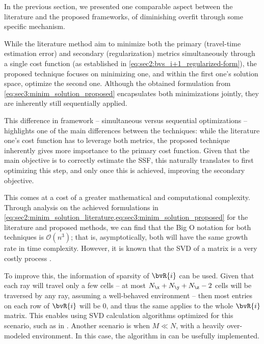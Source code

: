 In the previous section, we presented one comparable aspect between the literature and the proposed frameworks, of diminishing overfit through some specific mechanism.

While the literature method aim to minimize both the primary (travel-time estimation error) and secondary (regularization) metrics simultaneously through a single cost function (as established in \cref{eq:sec2:bvs_i+1_regularized-form}), the proposed technique focuses on minimizing one, and within the first one's solution space, optimize the second one. Although the obtained formulation from \cref{eq:sec3:minim_solution_proposed} encapsulates both minimizations jointly, they are inherently still sequentially applied.

This difference in framework -- simultaneous versus sequential optimizations -- highlights one of the main differences between the techniques: while the literature one's cost function has to leverage both metrics, the proposed technique inherently gives more importance to the primary cost function. Given that the main objective is to correctly estimate the SSF, this naturally translates to first optimizing this step, and only once this is achieved, improving the secondary objective.

This comes at a cost of a greater mathematical and computational complexity. Through analysis on the achieved formulations in \cref{eq:sec2:minim_solution_literature,eq:sec3:minim_solution_proposed} for the literature and proposed methods, we can find that the Big O notation \cite{big O} for both techniques is $\mathcal{O}(n^3)$; that is, asymptotically, both will have the same growth rate in time complexity. However, it is known that the SVD of a matrix is a very costly process \cite{svd computational costly}.

To improve this, the information of sparsity of $\bvR{i}$ can be used. Given that each ray will travel only a few cells -- at most $N_{\x} + N_{\y} + N_{\z} - 2$ cells will be traversed by any ray, assuming a well-behaved environment -- then most entries on each row of $\bvR{i}$ will be $0$, and thus the same applies to the whole $\bvR{i}$ matrix. This enables using SVD calculation algorithms optimized for this scenario, such as in  \cite{sairabanu_parallel_2015}. Another scenario is when $M \ll N$, with a heavily over-modeled environment. In this case, the algorithm in \cite{vasudevan_hierarchical_2019} can be usefully implemented.
